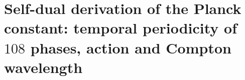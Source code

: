 \chapter{Self-dual derivation of the Planck constant: temporal periodicity of \(108\) phases, action and Compton wavelength}
\label{chap:p3-final:36:planck_autodual}



